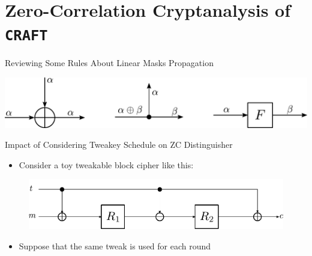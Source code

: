 \documentclass{beamer}
\begin{document}

\section{Zero-Correlation Cryptanalysis of \texttt{CRAFT}}
\begin{frame}{Reviewing Some Rules About Linear Masks Propagation}
\begin{center}
\includegraphics[scale=0.6]{./Images/linear_rules.pdf}
\end{center}
\end{frame}

\begin{frame}{Impact of Considering Tweakey Schedule on ZC Distinguisher}
\begin{itemize}
    \item Consider a toy tweakable block cipher like this:
\end{itemize}
\begin{figure}
\includegraphics[scale=0.7]{./Images/simple_toy_tbc.pdf}
\centering
\end{figure}
\begin{itemize}
    \item Suppose that the same tweak is used for each round
\end{itemize}
\end{frame}
\end{document}
